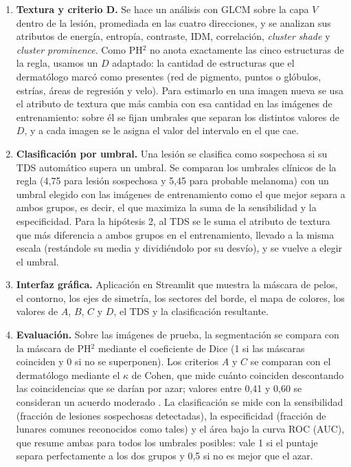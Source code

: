 \documentclass[11pt,a4paper]{article}
\begin{document}
\begin{enumerate}[label=\arabic*., leftmargin=1.6em, itemsep=6pt, topsep=4pt]
\item \textbf{Textura y criterio D.} Se hace un análisis con GLCM sobre
  la capa $V$ dentro de la lesión, promediada en las cuatro direcciones,
  y se analizan sus atributos de energía, entropía, contraste, IDM,
  correlación, \emph{cluster shade} y \emph{cluster prominence}. Como
  PH$^2$ no anota exactamente las cinco estructuras de la regla, usamos
  un $D$ adaptado: la cantidad de estructuras que el dermatólogo marcó
  como presentes (red de pigmento, puntos o glóbulos, estrías, áreas de
  regresión y velo). Para estimarlo en una imagen nueva se usa el
  atributo de textura que más cambia con esa cantidad en las imágenes de
  entrenamiento: sobre él se fijan umbrales que separan los distintos
  valores de $D$, y a cada imagen se le asigna el valor del intervalo en
  el que cae.

\item \textbf{Clasificación por umbral.} Una lesión se clasifica como
  sospechosa si su TDS automático supera un umbral. Se comparan los
  umbrales clínicos de la regla (4,75 para lesión sospechosa y 5,45 para
  probable melanoma) con un umbral elegido con las imágenes de
  entrenamiento como el que mejor separa a ambos grupos, es decir, el que
  maximiza la suma de la sensibilidad y la especificidad. Para la
  hipótesis 2, al TDS se le suma el atributo de textura que más
  diferencia a ambos grupos en el entrenamiento, llevado a la misma
  escala (restándole su media y dividiéndolo por su desvío), y se vuelve
  a elegir el umbral.

\item \textbf{Interfaz gráfica.} Aplicación en Streamlit que muestra la
  máscara de pelos, el contorno, los ejes de simetría, los sectores del
  borde, el mapa de colores, los valores de $A$, $B$, $C$ y $D$, el TDS y
  la clasificación resultante.

\item \textbf{Evaluación.} Sobre las imágenes de prueba, la segmentación
  se compara con la máscara de PH$^2$ mediante el coeficiente de Dice (1
  si las máscaras coinciden y 0 si no se superponen). Los criterios $A$
  y $C$ se comparan con el dermatólogo mediante el $\kappa$ de Cohen, que
  mide cuánto coinciden descontando las coincidencias que se darían por
  azar; valores entre 0,41 y 0,60 se consideran un acuerdo moderado
  \cite{landis}. La clasificación se mide con la sensibilidad (fracción
  de lesiones sospechosas detectadas), la especificidad (fracción de
  lunares comunes reconocidos como tales) y el área bajo la curva ROC
  (AUC), que resume ambas para todos los umbrales posibles: vale 1 si el
  puntaje separa perfectamente a los dos grupos y 0,5 si no es mejor que
  el azar.


\end{enumerate}
\end{document}
